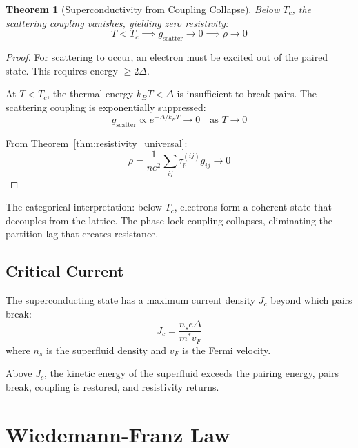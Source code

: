 \documentclass[twocolumn,showpacs,preprintnumbers,amsmath,amssymb,prd]{revtex4-2}
\newtheorem{theorem}{Theorem}[section]
\newcommand{\taup}{\tau_p}
\begin{document}
\begin{theorem}[Superconductivity from Coupling Collapse]
\label{thm:superconductivity}
Below $T_c$, the scattering coupling vanishes, yielding zero resistivity:
\begin{equation}
T < T_c \implies g_{\text{scatter}} \to 0 \implies \rho \to 0
\label{eq:superconductivity}
\end{equation}
\end{theorem}

\begin{proof}
For scattering to occur, an electron must be excited out of the paired state. This requires energy $\geq 2\Delta$.

At $T < T_c$, the thermal energy $k_BT < \Delta$ is insufficient to break pairs. The scattering coupling is exponentially suppressed:
\begin{equation}
g_{\text{scatter}} \propto e^{-\Delta/k_BT} \to 0 \quad \text{as } T \to 0
\label{eq:coupling_suppression}
\end{equation}

From Theorem~\ref{thm:resistivity_universal}:
\begin{equation}
\rho = \frac{1}{ne^2} \sum_{ij} \taup^{(ij)} g_{ij} \to 0
\end{equation}
\end{proof}

The categorical interpretation: below $T_c$, electrons form a coherent state that decouples from the lattice. The phase-lock coupling collapses, eliminating the partition lag that creates resistance.

\subsection{Critical Current}

The superconducting state has a maximum current density $J_c$ beyond which pairs break:
\begin{equation}
J_c = \frac{n_s e \Delta}{m^* v_F}
\label{eq:critical_current}
\end{equation}
where $n_s$ is the superfluid density and $v_F$ is the Fermi velocity.

Above $J_c$, the kinetic energy of the superfluid exceeds the pairing energy, pairs break, coupling is restored, and resistivity returns.


\section{Wiedemann-Franz Law}
\label{sec:wiedemann_franz}
\end{document}
